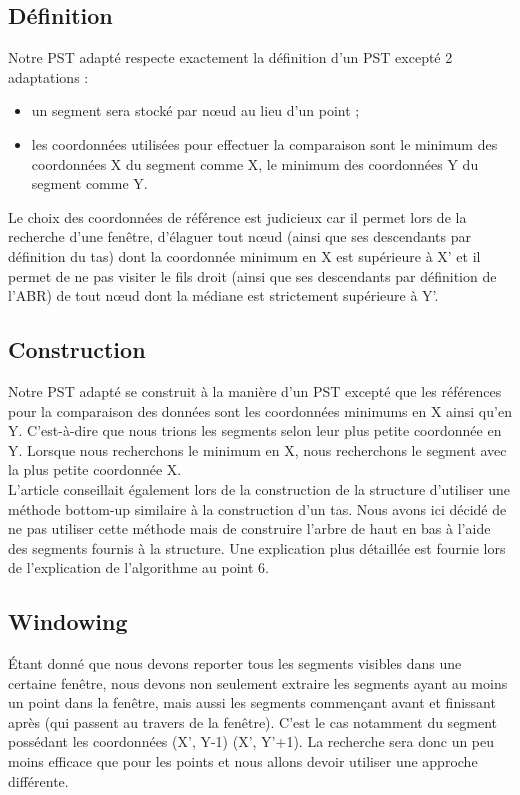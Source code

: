 \documentclass[10pt,a4paper]{article}
\begin{document}
\subsection{Définition}
Notre PST adapté respecte exactement la définition d'un PST excepté 2 adaptations :
\begin{itemize}
	\item un segment sera stocké par nœud au lieu d'un point ;
	\item les coordonnées utilisées pour effectuer la comparaison sont le minimum des coordonnées X du segment comme X, le minimum des coordonnées Y du segment comme Y.
\end{itemize}

Le choix des coordonnées de référence est judicieux car il permet lors de la recherche d'une fenêtre, d'élaguer tout nœud (ainsi que ses descendants par définition du tas) dont la coordonnée minimum en X est supérieure à X' et il permet de ne pas visiter le fils droit (ainsi que ses descendants par définition de l'ABR) de tout nœud dont la médiane est strictement supérieure à Y'.

\subsection{Construction}
Notre PST adapté se construit à la manière d'un PST excepté que les références pour la comparaison des données sont les coordonnées minimums en X ainsi qu'en Y. C'est-à-dire que nous trions les segments selon leur plus petite coordonnée en Y. Lorsque nous recherchons le minimum en X, nous recherchons le segment avec la plus petite coordonnée X.\\

L'article conseillait également lors de la construction de la structure d'utiliser une méthode bottom-up similaire à la construction d'un tas. Nous avons ici décidé de ne pas utiliser cette méthode mais de construire l'arbre de haut en bas à l'aide des segments fournis à la structure. Une explication plus détaillée est fournie lors de l'explication de l'algorithme au point 6.

\subsection{Windowing}
Étant donné que nous devons reporter tous les segments visibles dans une certaine fenêtre, nous devons non seulement extraire les segments ayant au moins un point dans la fenêtre, mais aussi les segments commençant avant et finissant après (qui passent au travers de la fenêtre). C'est le cas notamment du segment possédant les coordonnées (X', Y-1) (X', Y'+1). La recherche sera donc un peu moins efficace que pour les points et nous allons devoir utiliser une approche différente.
\end{document}
